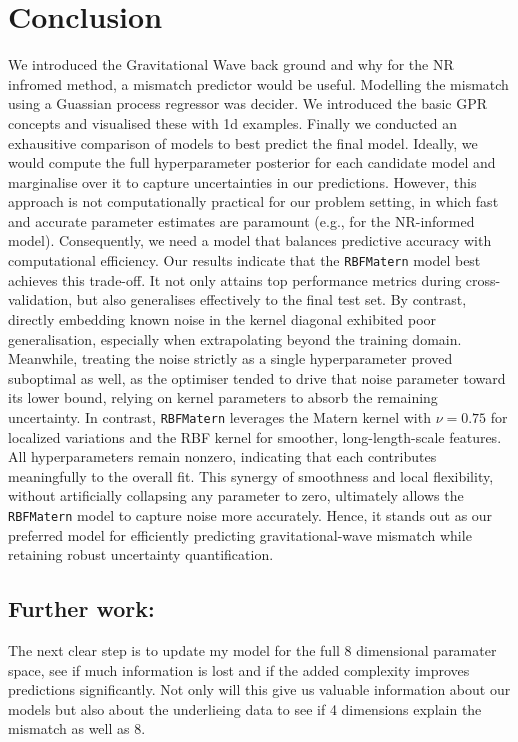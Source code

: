 \documentclass{ucdgradtaughtthesis}
\begin{document}
\chapter{Conclusion}
\label{sec:conclusion}
We introduced the Gravitational Wave back ground and why for the NR infromed method, a mismatch predictor would be useful.
Modelling the mismatch using a Guassian process regressor was decider. We introduced the basic GPR concepts and visualised these with 1d examples.
Finally we conducted an exhausitive comparison of models to best predict the final model.
Ideally, we would compute the full hyperparameter posterior for each candidate model and marginalise over it to capture uncertainties in our predictions. 
However, this approach is not computationally practical for our problem setting, in which fast and accurate parameter estimates are paramount (e.g., for the NR-informed model). 
Consequently, we need a model that balances predictive accuracy with computational efficiency.
%
Our results indicate that the \texttt{RBFMatern} model best achieves this trade-off. It not only attains top performance metrics during cross-validation, but also generalises effectively to the final test set. By contrast, directly embedding known noise in the kernel diagonal exhibited poor generalisation, especially when extrapolating beyond the training domain. Meanwhile, treating the noise strictly as a single hyperparameter proved suboptimal as well, as the optimiser tended to drive that noise parameter toward its lower bound, relying on kernel parameters to absorb the remaining uncertainty.
%
In contrast, \texttt{RBFMatern} leverages the Matern kernel with \(\nu = 0.75\) for localized variations and the RBF kernel for smoother, long-length-scale features. All hyperparameters remain nonzero, indicating that each contributes meaningfully to the overall fit. This synergy of smoothness and local flexibility, without artificially collapsing any parameter to zero, ultimately allows the \texttt{RBFMatern} model to capture noise more accurately. Hence, it stands out as our preferred model for efficiently predicting gravitational-wave mismatch while retaining robust uncertainty quantification.


\section{Further work:}
The next clear step is to update my model for the full 8 dimensional paramater space, see if much information is lost and if the added complexity improves predictions significantly. Not only will this give us valuable information
about our models but also about the underlieing data to see if 4 dimensions explain the mismatch as well as 8.
\end{document}
